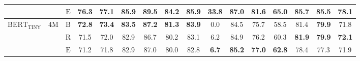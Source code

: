 \documentclass[11pt]{article}
\begin{document}
\begin{table}[tb!]
{\begin{tabular}{lccccccccccccccc}
 &  & $\text{E}$ & 76.3 & 77.1 & 85.9 & 89.5 & 84.2 & 85.9 & \textbf{33.8} & \textbf{87.0} & \textbf{81.6} & 65.0 & 85.7 & 85.5 & 78.1 \\ \hline
$\text{BERT}_{\text{TINY}}$ & 4M & $\text{B}$ & \textbf{72.8} & \textbf{73.4} & \textbf{83.5} & \textbf{87.2} & \textbf{81.3} & \textbf{83.9} & 0.0 & 84.5 & 75.7 & 58.5 & 81.4 & \textbf{79.9} & 71.8 \\
 &  & $\text{R}$ & 71.5 & 72.0 & 82.9 & 86.7 & 80.2 & 83.1 & 6.2 & 84.9 & 76.2 & 60.3 & \textbf{81.9} & \textbf{79.9} & \textbf{72.1} \\
 &  & $\text{E}$ & 71.2 & 71.8 & 82.9 & 87.0 & 80.0 & 82.8 & \textbf{6.7} & \textbf{85.2} & \textbf{77.0} & \textbf{62.8} & 78.4 & 77.3 & 71.9 \\ \hline
\end{tabular}}
\label{tab:teacher}
\end{table}
\end{document}
